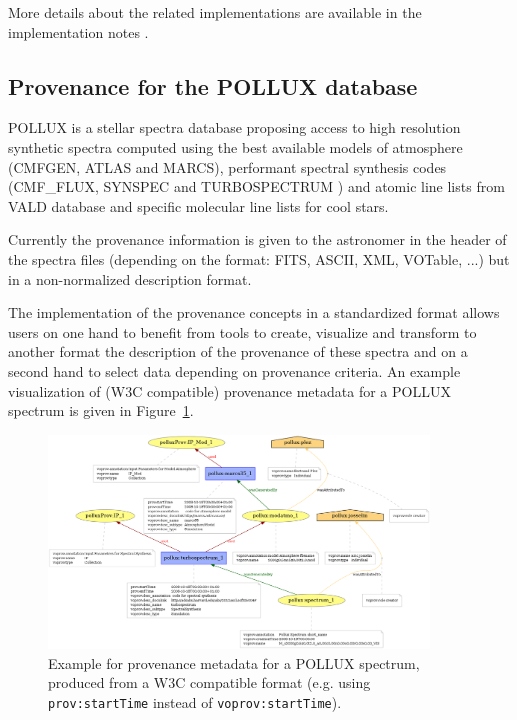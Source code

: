 More details about the related implementations are available in the implementation notes \citep{std:ProvenanceImplementationNote}.


\subsection{Provenance for the POLLUX database}

POLLUX is a stellar spectra database proposing access to high resolution synthetic spectra computed using the best available models of atmosphere (CMFGEN, ATLAS and MARCS), performant spectral synthesis codes (CMF\_FLUX, SYNSPEC and TURBOSPECTRUM ) and atomic line lists from VALD database and specific molecular line lists for cool stars. 

Currently the provenance information is given to the astronomer in the header of the spectra files (depending on the format: FITS, ASCII, XML, VOTable, ...) but in a non-normalized description format. 

The implementation of the provenance concepts in a standardized format allows users on one hand to benefit from tools to create, visualize and transform to another format the description of the provenance of these spectra and on a second hand to select data depending on provenance criteria. An example visualization of (W3C compatible) provenance metadata for a POLLUX spectrum is given in Figure~\ref{fig:pollux}.

\begin{figure}
\centering
\includegraphics[width=0.9\textwidth]{usecase_Pollux_example1.png}
\caption[Example for provenance metadata for a POLLUX spectrum]{Example for provenance metadata for a POLLUX spectrum, produced from a W3C compatible format (e.g. using \texttt{prov:startTime} instead of \texttt{voprov:startTime}).}
\label{fig:pollux}
\end{figure}

